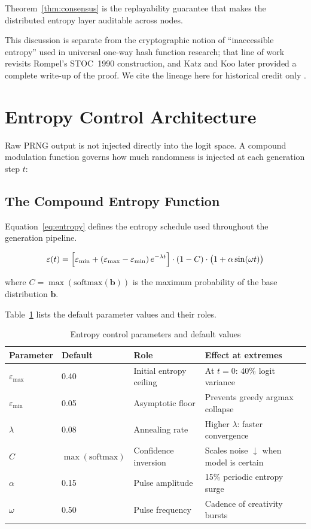 \documentclass[11pt,a4paper]{article}
\begin{document}
Theorem~\ref{thm:consensus} is the replayability guarantee that makes the distributed entropy layer auditable across nodes.

This discussion is separate from the cryptographic notion of 
``inaccessible entropy'' used in universal one-way hash function research; that line of work revisits Rompel's STOC~1990 construction, and Katz and Koo later provided a complete write-up of the proof. We cite the lineage here for historical credit only \cite{rompel1990,kk2005,uowhf2010}.

\section{Entropy Control Architecture}
\label{sec:entropy}

Raw PRNG output is not injected directly into the logit space. A compound modulation function governs how much randomness is injected at each generation step $t$:

\subsection{The Compound Entropy Function}

Equation~\eqref{eq:entropy} defines the entropy schedule used throughout the generation pipeline.

\begin{equation}
\varepsilon(t) = \Bigl[\varepsilon_{\min} + (\varepsilon_{\max} - \varepsilon_{\min})\,e^{-\lambda t}\Bigr]\cdot (1 - C)\cdot \bigl(1 + \alpha\sin(\omega t)\bigr)
\label{eq:entropy}
\end{equation}

\noindent where $C = \max(\text{softmax}(\mathbf{b}))$ is the maximum probability of the base distribution $\mathbf{b}$.

Table~\ref{tab:params} lists the default parameter values and their roles.

\begin{table}[h]
\centering
\caption{Entropy control parameters and default values}
\label{tab:params}
\begin{tabular}{@{}llll@{}}
\toprule
Parameter & Default & Role & Effect at extremes \\
\midrule
$\varepsilon_{\max}$ & 0.40 & Initial entropy ceiling & At $t{=}0$: 40\% logit variance \\
$\varepsilon_{\min}$ & 0.05 & Asymptotic floor & Prevents greedy argmax collapse \\
$\lambda$ & 0.08 & Annealing rate & Higher $\lambda$: faster convergence \\
$C$ & $\max(\text{softmax})$ & Confidence inversion & Scales noise $\downarrow$ when model is certain \\
$\alpha$ & 0.15 & Pulse amplitude & 15\% periodic entropy surge \\
$\omega$ & 0.50 & Pulse frequency & Cadence of creativity bursts \\
\bottomrule
\end{tabular}
\end{table}
\end{document}
